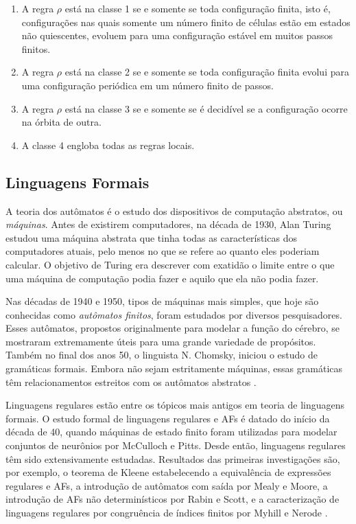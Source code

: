 \documentclass[12pt,a4paper]{article}
\begin{document}
\begin{enumerate}
\item A regra $\rho$ está na classe 1 se e somente se toda configuração finita,
isto é, configurações nas quais somente um número finito de células estão em
estados não quiescentes, evoluem para uma configuração estável em muitos passos
finitos.

\item A regra $\rho$ está na classe 2 se e somente se toda configuração finita
evolui para uma configuração periódica em um número finito de passos.

\item A regra $\rho$ está na classe 3 se e somente se é decidível se a
configuração ocorre na órbita de outra.

\item A classe 4 engloba todas as regras locais.
\end{enumerate}

\subsection{Linguagens Formais}

A teoria dos autômatos é o estudo dos dispositivos de computação abstratos,
ou \textit{máquinas}. Antes de existirem computadores, na década de 1930, Alan
Turing estudou uma máquina abstrata que tinha todas as características dos
computadores atuais, pelo menos no que se refere ao quanto eles poderiam 
calcular. O objetivo de Turing era descrever com exatidão o limite entre
o que uma máquina de computação podia fazer e aquilo que ela não podia fazer.

Nas décadas de 1940 e 1950, tipos de máquinas mais simples, que hoje são
conhecidas como \textit{autômatos finitos}, foram estudados por diversos
pesquisadores. Esses autômatos, propostos originalmente para modelar a
função do cérebro, se mostraram extremamente úteis para uma grande variedade
de propósitos. Também no final dos anos 50, o linguista N. Chomsky, iniciou
o estudo de gramáticas formais. Embora não sejam estritamente máquinas,
essas gramáticas têm relacionamentos estreitos com os autômatos abstratos
.

Linguagens regulares estão entre os tópicos mais antigos em teoria de
linguagens formais. O estudo formal de linguagens regulares
e AFs é datado do início da década de 40, quando máquinas
de estado finito foram utilizadas para modelar conjuntos de neurônios
por McCulloch e Pitts. Desde então, linguagens regulares têm sido
extensivamente estudadas. Resultados das primeiras investigações são,
por exemplo, o teorema de Kleene estabelecendo a equivalência de
expressões regulares e AFs, a introdução de autômatos
com saída por Mealy e Moore, a introdução de AFs não
determinísticos por Rabin e Scott, e a caracterização de linguagens
regulares por congruência de índices finitos por Myhill e Nerode
.
\end{document}
